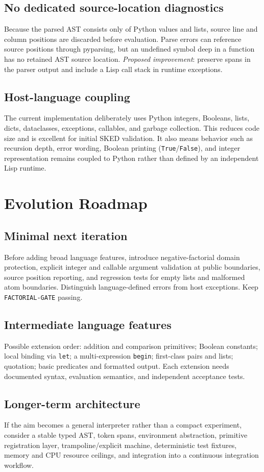 \documentclass[11pt,a4paper,oneside]{report}
\begin{document}
\section{No dedicated source-location diagnostics}
Because the parsed AST consists only of Python values and lists, source line and column positions are discarded before evaluation. Parse errors can reference source positions through pyparsing, but an undefined symbol deep in a function has no retained AST source location. \emph{Proposed improvement}: preserve spans in the parser output and include a Lisp call stack in runtime exceptions.
\section{Host-language coupling}
The current implementation deliberately uses Python integers, Booleans, lists, dicts, dataclasses, exceptions, callables, and garbage collection. This reduces code size and is excellent for initial SKED validation. It also means behavior such as recursion depth, error wording, Boolean printing (\texttt{True}/\texttt{False}), and integer representation remains coupled to Python rather than defined by an independent Lisp runtime.

\chapter{Evolution Roadmap}
\section{Minimal next iteration}
Before adding broad language features, introduce negative-factorial domain protection, explicit integer and callable argument validation at public boundaries, source position reporting, and regression tests for empty lists and malformed atom boundaries. Distinguish language-defined errors from host exceptions. Keep \texttt{FACTORIAL-GATE} passing.
\section{Intermediate language features}
Possible extension order: addition and comparison primitives; Boolean constants; local binding via \texttt{let}; a multi-expression \texttt{begin}; first-class pairs and lists; quotation; basic predicates and formatted output. Each extension needs documented syntax, evaluation semantics, and independent acceptance tests.
\section{Longer-term architecture}
If the aim becomes a general interpreter rather than a compact experiment, consider a stable typed AST, token spans, environment abstraction, primitive registration layer, trampoline/explicit machine, deterministic test fixtures, memory and CPU resource ceilings, and integration into a continuous integration workflow.
\end{document}
